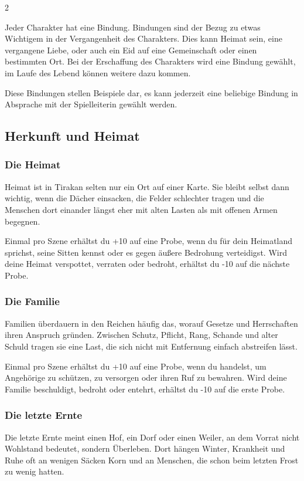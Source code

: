 {
    \begin{multicols*}{2}

        Jeder Charakter hat eine Bindung. Bindungen sind der Bezug zu etwas Wichtigem in der Vergangenheit des Charakters. Dies kann Heimat sein, eine vergangene Liebe, oder auch ein Eid auf eine Gemeinschaft oder einen bestimmten Ort. Bei der Erschaffung des Charakters wird eine Bindung gewählt, im Laufe des Lebend können weitere dazu kommen.

        Diese Bindungen stellen Beispiele dar, es kann jederzeit eine beliebige Bindung in Absprache mit der Spielleiterin gewählt werden.

        \subsection{Herkunft und Heimat}\label{subsec:bindungen-herkunft}

        \subsubsection*{Die Heimat}
        Heimat ist in Tirakan selten nur ein Ort auf einer Karte. Sie bleibt selbst dann wichtig, wenn die Dächer einsacken, die Felder schlechter tragen und die Menschen dort einander längst eher mit alten Lasten als mit offenen Armen begegnen.

        \bindungspielwertebox
        {Einmal pro Szene erhältst du +10 auf eine Probe, wenn du für dein Heimatland sprichst, seine Sitten kennst oder es gegen äußere Bedrohung verteidigst.}
        {Wird deine Heimat verspottet, verraten oder bedroht, erhältst du -10 auf die nächste Probe.}

        \subsubsection*{Die Familie}
        Familien überdauern in den Reichen häufig das, worauf Gesetze und Herrschaften ihren Anspruch gründen. Zwischen Schutz, Pflicht, Rang, Schande und alter Schuld tragen sie eine Last, die sich nicht mit Entfernung einfach abstreifen lässt.

        \bindungspielwertebox
        {Einmal pro Szene erhältst du +10 auf eine Probe, wenn du handelst, um Angehörige zu schützen, zu versorgen oder ihren Ruf zu bewahren.}
        {Wird deine Familie beschuldigt, bedroht oder entehrt, erhältst du -10 auf die erste Probe.}

        \subsubsection*{Die letzte Ernte}
        Die letzte Ernte meint einen Hof, ein Dorf oder einen Weiler, an dem Vorrat nicht Wohlstand bedeutet, sondern Überleben. Dort hängen Winter, Krankheit und Ruhe oft an wenigen Säcken Korn und an Menschen, die schon beim letzten Frost zu wenig hatten.


\end{multicols*}}
